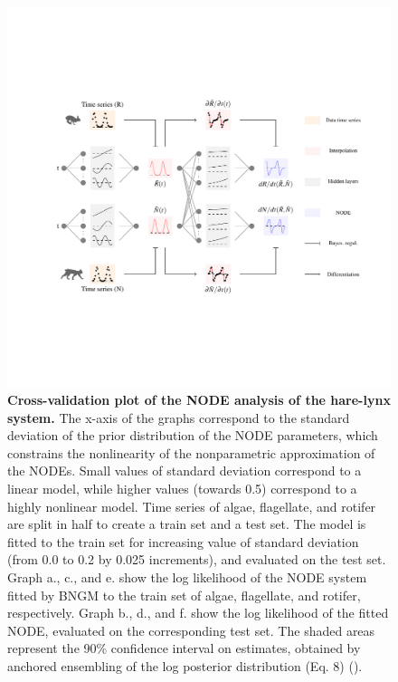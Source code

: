\documentclass[11pt, oneside]{article}
\begin{document}
\newpage
\begin{figure}[H]
\includegraphics[width=1\linewidth,page=24]{figures/main.pdf}
\caption{
    \textbf{Cross-validation plot of the NODE analysis of the hare-lynx system.}
    The x-axis of the graphs correspond to the standard deviation of the prior distribution of the NODE parameters, which constrains the nonlinearity of the nonparametric approximation of the NODEs.
    Small values of standard deviation correspond to a linear model, while higher values (towards 0.5) correspond to a highly nonlinear model.
    Time series of algae, flagellate, and rotifer are split in half to create a train set and a test set. 
    The model is fitted to the train set for increasing value of standard deviation (from 0.0 to 0.2 by 0.025 increments), and evaluated on the test set.
    Graph a., c., and e. show the log likelihood of the NODE system fitted by BNGM to the train set of algae, flagellate, and rotifer, respectively.
    Graph b., d., and f. show the log likelihood of the fitted NODE, evaluated on the corresponding test set.
    The shaded areas represent the 90\% confidence interval on estimates, obtained by anchored ensembling of the log posterior distribution (Eq. 8) (\cite{Pearce2018}).
}
\end{figure}
\newpage
\end{document}
